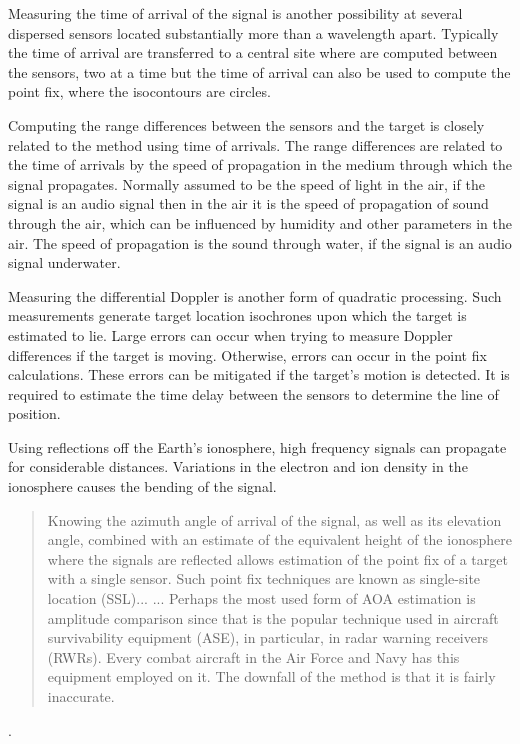 \documentclass[english,purist]{ist-report}
\begin{document}
Measuring the time of arrival of the signal is another possibility at
several dispersed sensors located substantially more than a wavelength apart. Typically the time of arrival are transferred to a central site where are computed between the sensors, two at a time but the time of arrival can also be used to compute the point fix, where the isocontours are circles.

Computing the range differences between the sensors and the target is closely related to the method using time of arrivals. The range differences are related to the time of arrivals by the speed of propagation in the medium through which the signal propagates.
Normally assumed to be the speed of light in the air, if the signal is an audio signal then in the air it is the speed of propagation of sound through the air, which can be influenced by humidity and other parameters in the air. The speed of propagation is the sound through water, if the signal is an audio signal underwater.

Measuring the differential Doppler is another form of quadratic processing. Such measurements generate target location isochrones upon which the target is estimated to lie.  Large errors can occur when trying to measure Doppler differences if the target is moving.
Otherwise, errors can occur in the point fix calculations. These errors can be mitigated if the target's motion is detected. It is required to estimate the time delay between the sensors to determine the line of position. 

Using reflections off the Earth’s ionosphere, high frequency signals can propagate for considerable distances. Variations in the electron and ion density in the ionosphere causes the bending of the signal.

\begin{quote} \itshape
    
Knowing the azimuth angle of arrival of the signal, as well as its elevation angle, combined with an estimate of the equivalent height of the ionosphere where the signals are reflected allows estimation of the point fix of a target with a single sensor. Such point fix techniques are known as single-site location (SSL)...
... Perhaps the most used form of AOA estimation is amplitude comparison since that is the popular technique used in aircraft survivability equipment (ASE), in particular, in radar warning receivers (RWRs). Every combat aircraft in the Air
Force and Navy has this equipment employed on it. The downfall of the method is that it is fairly inaccurate.
\end{quote} \cite{poiseltarget}.
 
\end{document}
